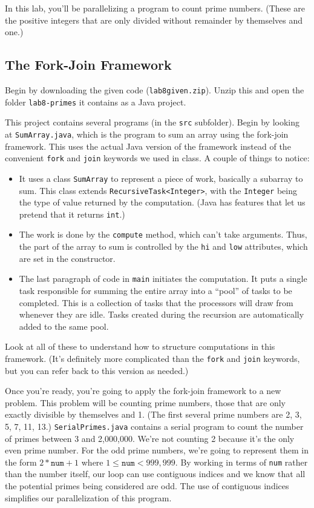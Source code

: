 \documentclass{article}
\begin{document}
In this lab, you'll be parallelizing a program to count prime numbers.
(These are the positive integers that are only divided without
remainder by themselves and one.)

\subsection*{The Fork-Join Framework}

Begin by downloading the given code ({\tt lab8given.zip}).
Unzip this and open the folder {\tt lab8-primes} it contains as a
Java project.

This project contains several programs (in the {\tt src} subfolder).
Begin by looking at {\tt SumArray.java}, which is the 
program to sum an array using the fork-join framework.
This uses the actual Java version of the framework instead of the
convenient {\tt fork} and {\tt join} keywords we used in class.
A couple of things to notice:
\begin{itemize}
  \item It uses a class {\tt SumArray} to represent a piece of work,
    basically a subarray to sum.
    This class extends {\tt RecursiveTask<Integer>}, with the
    {\tt Integer} being the type of value returned by the computation.
    (Java has features that let us pretend that it returns {\tt int}.)
  \item The work is done by the {\tt compute} method, which can't take
    arguments.
    Thus, the part of the array to sum is controlled by the {\tt hi}
    and {\tt low} attributes, which are set in the constructor.
  \item The last paragraph of code in {\tt main} initiates the computation.
    It puts a single task responsible for summing the entire array
    into a ``pool'' of tasks to be completed.
    This is a collection of tasks that the processors will draw from
    whenever they are idle.
    Tasks created during the recursion are automatically added to the
    same pool.
\end{itemize}
Look at all of these to understand how to structure computations in
this framework.
(It's definitely more complicated than the {\tt fork} and {\tt join}
keywords, but you can refer back to this version as needed.)

Once you're ready, you're going to apply the fork-join framework to a
new problem. 
This problem will be counting prime numbers, those that are only
exactly divisible by themselves and 1.
(The first several prime numbers are 2, 3, 5, 7, 11, 13.)
{\tt SerialPrimes.java} contains a serial program to count the number
of primes between 3 and 2,000,000.
We're not counting 2 because it's the only even prime number.
For the odd prime numbers, we're going to represent them in the form
$2*\mathtt{num}+1$ where $1 \leq \mathtt{num} < 999,999$.
By working in terms of {\tt num} rather than the number itself, our loop can
use contiguous indices and we know that all the potential primes being
considered are odd.
The use of contiguous indices simplifies our parallelization of this program.
\end{document}
